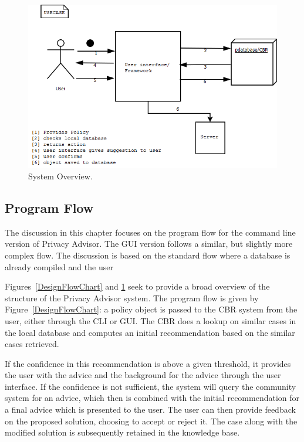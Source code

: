 \begin{figure}[htbp]
\begin{center}
\includegraphics[width = \textwidth]{DesignReport/uml/Case.png}
\caption{System Overview.}
\label{SystemOverview}
\end{center}
\end{figure}

\subsection{Program Flow}
The discussion in this chapter focuses on the program flow for the command line version of Privacy Advisor. The GUI version follows a similar, but slightly more complex flow. The discussion is based on the standard flow where a database is already compiled and the user 

Figures~\ref{DesignFlowChart} and \ref{SystemOverview} seek to provide a broad overview of the structure of the Privacy Advisor system. The program flow is given by Figure~\ref{DesignFlowChart}: a policy object is passed to the CBR system from the user, either through the CLI or GUI. The CBR does a lookup on similar cases in the local database and computes an initial recommendation based on the similar cases retrieved. 

If the confidence in this recommendation is above a given threshold, it provides the user with the advice and the background for the advice through the user interface. If the confidence is not sufficient, the system will query the community system for an advice, which then is combined with the initial recommendation for a final advice which is presented to the user. The user can then provide feedback on the proposed solution, choosing to accept or reject it. The case along with the modified solution is subsequently retained in the knowledge base.

